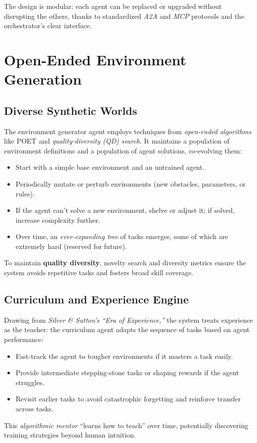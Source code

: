 \documentclass{article}
\begin{document}
\noindent The design is modular: each agent can be replaced or upgraded without disrupting the others, thanks to standardized \emph{A2A} and \emph{MCP} protocols and the orchestrator’s clear interface.

\section{Open-Ended Environment Generation}

\subsection{Diverse Synthetic Worlds}
The environment generator agent employs techniques from \emph{open-ended algorithms} like POET and \emph{quality-diversity (QD) search}. It maintains a population of environment definitions and a population of agent solutions, co-evolving them:
\begin{itemize}
  \item Start with a simple base environment and an untrained agent.
  \item Periodically mutate or perturb environments (new obstacles, parameters, or rules).
  \item If the agent can’t solve a new environment, shelve or adjust it; if solved, increase complexity further.
  \item Over time, an \emph{ever-expanding tree} of tasks emerges, some of which are extremely hard (reserved for future).
\end{itemize}
To maintain \textbf{quality diversity}, novelty search and diversity metrics ensure the system avoids repetitive tasks and fosters broad skill coverage.

\subsection{Curriculum and Experience Engine}
Drawing from \emph{Silver \& Sutton’s “Era of Experience,”} the system treats experience as the teacher: the curriculum agent adapts the sequence of tasks based on agent performance:
\begin{itemize}
  \item Fast-track the agent to tougher environments if it masters a task easily.
  \item Provide intermediate stepping-stone tasks or shaping rewards if the agent struggles.
  \item Revisit earlier tasks to avoid catastrophic forgetting and reinforce transfer across tasks.
\end{itemize}
This \emph{algorithmic mentor} “learns how to teach” over time, potentially discovering training strategies beyond human intuition.
\end{document}
